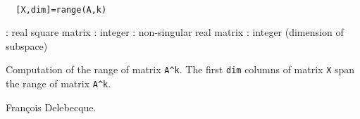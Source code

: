 \begin{mandesc}
   \\ %
\end{mandesc}
\begin{calling_sequence}
\begin{verbatim}
  [X,dim]=range(A,k)  
\end{verbatim}
\end{calling_sequence}
\begin{parameters}
  \begin{varlist}
    : real square matrix
    : integer
    : non-singular real matrix
    : integer (dimension of subspace)
  \end{varlist}
\end{parameters}
\begin{mandescription}
  Computation of the range of matrix \verb!A^k!. The first \verb+dim+ columns of matrix 
  \verb!X! span the range of matrix \verb!A^k!.
\end{mandescription}
\begin{manseealso}
     
\end{manseealso}
\begin{authors}
  Fran\c{c}ois Delebecque.
\end{authors}
